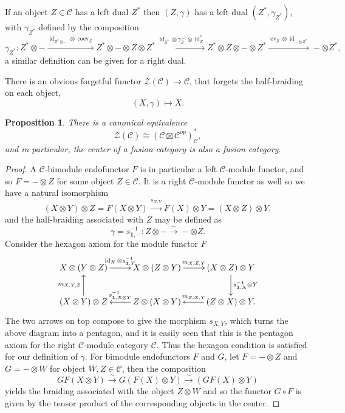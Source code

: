 \documentclass[11pt]{book}
\newtheorem{Prop}[theorem]{Proposition}
\theoremstyle{Rem}
\theoremstyle{definition}
\numberwithin{equation}{section}
\newcommand\inv{^{-1}}
\newcommand\id{\operatorname{id}}
\newcommand\ot{\otimes}
\newcommand\C{\mathcal C}
\newcommand\CTR{\mathcal Z}
\newcommand{\xra}\xrightarrow
\newcommand\one{\mathbf{1}}
\newcommand\ev{\operatorname{ev}}
\newcommand\coev{\operatorname{coev}}
\begin{document}
If an object $Z\in \C$ has a left dual $Z^*$ then $(Z, \gamma)$ has a left dual $(Z^*, \gamma_{Z^*})$, with $\gamma_{Z^*}$ defined by the composition\begin{equation}
	\gamma_{Z^*}: Z^*\otimes - \xrightarrow{\id_{Z^*\otimes -} \otimes \coev_Z} Z^*\otimes - \otimes Z\otimes Z^* \xrightarrow{\id_{Z^*}\otimes \gamma_Z\inv \otimes \id_Z^*} Z^*\otimes Z \otimes - \otimes Z^*  \xrightarrow{\ev_Z \otimes \id_{-\otimes Z^*}} -\otimes Z^*,
\end{equation} 
a similar definition can be given for a right dual.

There is an obvious forgetful functor $\CTR(\C)\rightarrow \C$, that forgets the half-braiding on each object,
\begin{equation}
	(X, \gamma)\mapsto X.
\end{equation}

\begin{Prop}
There is a canonical equivalence \begin{equation}
	\CTR(\C) \cong (\C\boxtimes \C^{op})^*_{\C} ,
\end{equation} and in particular, the center of a fusion category is also a fusion category.
\end{Prop}
\begin{proof}
A $\C$-bimodule endofunctor $F$ is in particular a left $\C$-module functor, and so $F= -\ot Z$ for some object $Z\in \C$. It is a right $\C$-module functor as well so we have a natural isomorphism \begin{equation}
	(X\ot Y) \ot Z = F(X\ot Y) \xra{s_{X, Y}} F(X) \ot Y = (X\ot Z)\ot Y,
\end{equation}
and the half-braiding associated with $Z$ may be defined as \begin{equation}
	 \gamma = s\inv_{\one, -}: Z \ot - \xra{\sim} -\ot Z.
\end{equation}
Consider the hexagon axiom for the module functor $F$
\[
\xymatrix{
X \ot (Y\ot Z) \ar[r]^{\id_X \ot s\inv_{\one, Y}} & X \ot (Z \ot Y)\ar[r]^{m_{X, Z, Y}} & (X\ot Z) \ot Y \ar[d]^{s\inv_{\one, X} \ot Y} \\
(X\ot Y )\ot Z \ar[u]^{m_{X, Y, Z}}& Z\ot (X\ot Y)\ar[l]_{s\inv_{\one, X\ot Y}} & (Z \ot X) \ot Y. \ar[l]_{m_{Z, X, Y}}  \\   
}
\]
The two arrows on top compose to give the morphism $s_{X, Y}$, which turns the above diagram into a pentagon, and it is easily seen that this is the pentagon axiom for the right $\C$-module category $\C$. Thus the hexagon condition is satisfied for our definition of $\gamma$.
For bimodule endofunctors $F$ and $G$, let $F= -\ot Z$ and $G = -\ot W$ for object $W, Z \in \C$, then the composition \begin{equation}
	GF(X\ot Y) \xra{\sim} G(F(X)\ot Y) \xra{\sim}(GF(X) \ot Y)
\end{equation} yields the braiding associated with the object $Z\ot W$ and so the functor $G\circ F$ is given by the tensor product of the corresponding objects in the center.
\end{proof}
\end{document}
